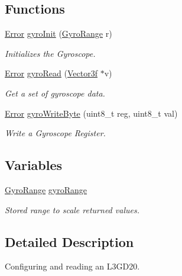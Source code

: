\subsection*{Functions}
\begin{DoxyCompactItemize}
\item 
\hyperlink{group__error_ga2c3e4bb40f36b262a5214e2da2bca9c5}{Error} \hyperlink{group__gyro_ga276b9ab6ac85c65b5a55356c00958be7}{gyro\-Init} (\hyperlink{group__gyro_ga12b0e0572fdceaa90874f9364c862ead}{Gyro\-Range} r)
\begin{DoxyCompactList}\small\item\em Initializes the Gyroscope. \end{DoxyCompactList}\item 
\hyperlink{group__error_ga2c3e4bb40f36b262a5214e2da2bca9c5}{Error} \hyperlink{group__gyro_gab90a6ac7c268152edb186ee699462fd8}{gyro\-Read} (\hyperlink{struct_vector3f}{Vector3f} $\ast$v)
\begin{DoxyCompactList}\small\item\em Get a set of gyroscope data. \end{DoxyCompactList}\item 
\hyperlink{group__error_ga2c3e4bb40f36b262a5214e2da2bca9c5}{Error} \hyperlink{group__gyro_ga779a6d1a0641fc1ddc530366f582961b}{gyro\-Write\-Byte} (uint8\-\_\-t reg, uint8\-\_\-t val)
\begin{DoxyCompactList}\small\item\em Write a Gyroscope Register. \end{DoxyCompactList}\end{DoxyCompactItemize}
\subsection*{Variables}
\begin{DoxyCompactItemize}
\item 
\hyperlink{group__gyro_ga12b0e0572fdceaa90874f9364c862ead}{Gyro\-Range} \hyperlink{group__gyro_gaa2ed27a7e4a0d8a5f492ef6059a04615}{gyro\-Range}
\begin{DoxyCompactList}\small\item\em Stored range to scale returned values. \end{DoxyCompactList}\end{DoxyCompactItemize}


\subsection{Detailed Description}
Configuring and reading an L3\-G\-D20. 

